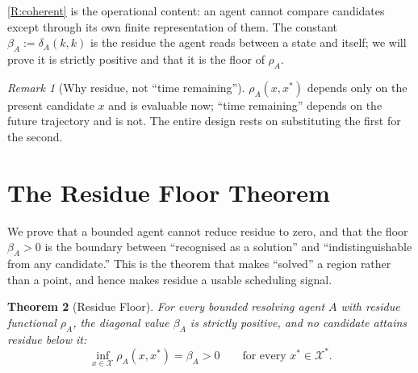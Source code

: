 \documentclass[twocolumn,10pt,a4paper]{article}
\theoremstyle{thmstyle}
\newtheorem{theorem}{Theorem}[section]
\theoremstyle{definition}
\theoremstyle{remark}
\newtheorem{remark}[theorem]{Remark}
\newcommand{\floor}{\beta}
\newcommand{\res}{\rho}
\begin{document}
\ref{R:coherent} is the operational content: an agent cannot compare
candidates except through its own finite representation of them. The
constant $\floor_A:=\delta_A(k,k)$ is the residue the agent reads between
a state and itself; we will prove it is strictly positive and that it is
the floor of $\res_A$.

\begin{remark}[Why residue, not ``time remaining'']
\label{rem:why-residue}
$\res_A(x,x^\ast)$ depends only on the present candidate $x$ and is
evaluable now; ``time remaining'' depends on the future trajectory and is
not. The entire design rests on substituting the first for the second.
\end{remark}

\section{The Residue Floor Theorem}
\label{sec:floor}

We prove that a bounded agent cannot reduce residue to zero, and that the
floor $\floor_A>0$ is the boundary between ``recognised as a solution''
and ``indistinguishable from any candidate.'' This is the theorem that
makes ``solved'' a region rather than a point, and hence makes residue a
usable scheduling signal.

\begin{theorem}[Residue Floor]
\label{thm:floor}
For every bounded resolving agent $A$ with residue functional $\res_A$,
the diagonal value $\floor_A$ is strictly positive, and no candidate
attains residue below it:
\[
\inf_{x\in\mathcal{X}}\res_A(x,x^\ast)=\floor_A>0
\qquad\text{for every }x^\ast\in\mathcal{X}^\ast .
\]
\end{theorem}
\end{document}
